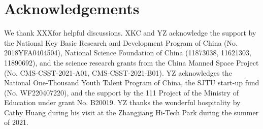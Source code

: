 \documentclass[fleqn,usenatbib]{mnras}
\newcommand*\xxx{{\color{red}XXX}}
\begin{document}
\section*{Acknowledgements}

We thank \xxx for helpful
discussions.  XKC and YZ acknowledge the support by the National Key Basic
Research and Development Program of China (No.  2018YFA0404504), National
Science Foundation of China (11873038, 11621303, 11890692), and the science
research grants from the China Manned Space Project (No.
CMS-CSST-2021-A01, CMS-CSST-2021-B01). YZ acknowledges the National
One-Thousand Youth Talent Program of China, the SJTU start-up fund (No.
WF220407220), and the support by the 111 Project of the Ministry of
Education under grant No. B20019. YZ thanks the wonderful hospitality by
Cathy Huang during his visit at the Zhangjiang Hi-Tech Park during the
summer of 2021.








\begin{thebibliography}{}
\makeatletter
\relax
\def\mn@urlcharsother{\let\do\@makeother \do\$\do\&\do\#\do\^\do\_\do\%\do\~}
\def\mn@doi{\begingroup\mn@urlcharsother \@ifnextchar [ {\mn@doi@}
  {\mn@doi@[]}}
\def\mn@doi@[#1]#2{\def\@tempa{#1}\ifx\@tempa\@empty \href
  {http://dx.doi.org/#2} {doi:#2}\else \href {http://dx.doi.org/#2} {#1}\fi
  \endgroup}
\def\mn@eprint#1#2{\mn@eprint@#1:#2::\@nil}
\def\mn@eprint@arXiv#1{\href {http://arxiv.org/abs/#1} {{\tt arXiv:#1}}}
\def\mn@eprint@dblp#1{\href {http://dblp.uni-trier.de/rec/bibtex/#1.xml}
  {dblp:#1}}
\def\mn@eprint@#1:#2:#3:#4\@nil{\def\@tempa {#1}\def\@tempb {#2}\def\@tempc
  {#3}\ifx \@tempc \@empty \let \@tempc \@tempb \let \@tempb \@tempa \fi \ifx
  \@tempb \@empty \def\@tempb {arXiv}\fi \@ifundefined
  {mn@eprint@\@tempb}{\@tempb:\@tempc}{\expandafter \expandafter \csname
  mn@eprint@\@tempb\endcsname \expandafter{\@tempc}}}


\makeatother
\end{thebibliography}



\bsp	%
\label{lastpage}
\end{document}
